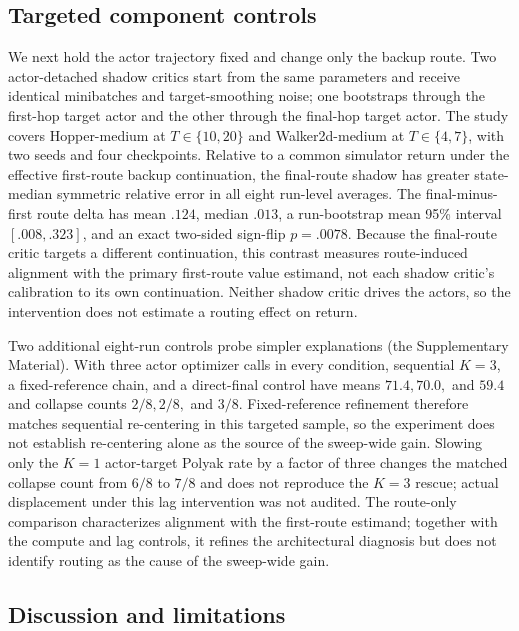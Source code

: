 \documentclass[letterpaper]{article}
\begin{document}
\subsection{Targeted component controls}

We next hold the actor trajectory fixed and change only the backup route. Two actor-detached shadow critics start from the same parameters and receive identical minibatches and target-smoothing noise; one bootstraps through the first-hop target actor and the other through the final-hop target actor. The study covers Hopper-medium at $T\in\{10,20\}$ and Walker2d-medium at $T\in\{4,7\}$, with two seeds and four checkpoints. Relative to a common simulator return under the effective first-route backup continuation, the final-route shadow has greater state-median symmetric relative error in all eight run-level averages. The final-minus-first route delta has mean $.124$, median $.013$, a run-bootstrap mean 95\% interval $[.008,.323]$, and an exact two-sided sign-flip $p=.0078$. Because the final-route critic targets a different continuation, this contrast measures route-induced alignment with the primary first-route value estimand, not each shadow critic's calibration to its own continuation. Neither shadow critic drives the actors, so the intervention does not estimate a routing effect on return.

Two additional eight-run controls probe simpler explanations (the Supplementary Material). With three actor optimizer calls in every condition, sequential $K=3$, a fixed-reference chain, and a direct-final control have means $71.4,70.0,$ and $59.4$ and collapse counts $2/8,2/8,$ and $3/8$. Fixed-reference refinement therefore matches sequential re-centering in this targeted sample, so the experiment does not establish re-centering alone as the source of the sweep-wide gain. Slowing only the $K=1$ actor-target Polyak rate by a factor of three changes the matched collapse count from $6/8$ to $7/8$ and does not reproduce the $K=3$ rescue; actual displacement under this lag intervention was not audited. The route-only comparison characterizes alignment with the first-route estimand; together with the compute and lag controls, it refines the architectural diagnosis but does not identify routing as the cause of the sweep-wide gain.

\subsection{Discussion and limitations}
\end{document}
